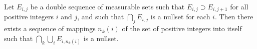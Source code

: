Let $E_{i,j}$ be a double sequence of measurable sets such that $E_{i,j} \supset E_{i,j+1}$ for all positive integers $i$ and $j$, and such that $\bigcap_j E_{i,j}$ is a nullset for each $i$. Then there exists a sequence of mappings $n_k(i)$ of the set of positive integers into itself such that $\bigcap_k \bigcup_i E_{i,n_k(i)}$ is a nullset.
